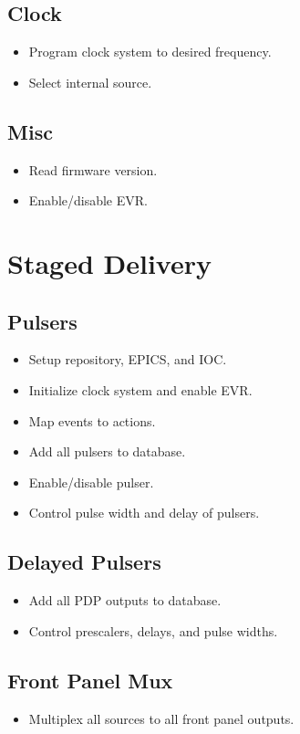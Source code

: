 \documentclass[a4paper,10pt]{article}
\begin{document}
	\subsection{Clock}
	\begin{itemize}
		\item Program clock system to desired frequency.
		\item Select internal source.
	\end{itemize}

	\subsection{Misc}
	\begin{itemize}
		\item Read firmware version.
		\item Enable/disable EVR.
	\end{itemize}

\section{Staged Delivery}
	\subsection{Pulsers}
	\begin{itemize}
		\item Setup repository, EPICS, and IOC.
		\item Initialize clock system and enable EVR.
		\item Map events to actions.
		\item Add all pulsers to database.
		\item Enable/disable pulser.
		\item Control pulse width and delay of pulsers.
	\end{itemize}

	\subsection{Delayed Pulsers}
	\begin{itemize}
		\item Add all PDP outputs to database.
		\item Control prescalers, delays, and pulse widths.
	\end{itemize}

	\subsection{Front Panel Mux}
	\begin{itemize}
		\item Multiplex all sources to all front panel outputs.
	\end{itemize}
\end{document}
